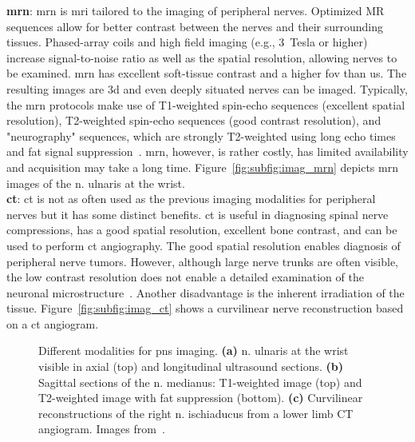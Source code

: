 \textbf{\gls{mrn}}: \gls{mrn} is \gls{mri} tailored to the imaging of peripheral nerves. Optimized MR sequences allow for better contrast between the nerves and their surrounding tissues. Phased-array coils and high field imaging (e.g., 3~Tesla or higher) increase signal-to-noise ratio as well as the spatial resolution, allowing nerves to be examined. \gls{mrn} has excellent soft-tissue contrast and a higher \gls{fov} than \gls{us}. The resulting images are \gls{3d} and even deeply situated nerves can be imaged. Typically, the \gls{mrn} protocols make use of T1-weighted spin-echo sequences (excellent spatial resolution), T2-weighted spin-echo sequences (good contrast resolution), and "neurography" sequences, which are strongly T2-weighted using long echo times and fat signal suppression~\cite{Ohana2014CurrentSystem}. \gls{mrn}, however, is rather costly, has limited availability and acquisition may take a long time. Figure~\ref{fig:subfig:imag_mrn} depicts \gls{mrn} images of the \gls{n.} ulnaris at the wrist.\\

\textbf{\gls{ct}}: \gls{ct} is not as often used as the previous imaging modalities for peripheral nerves but it has some distinct benefits. \gls{ct} is useful in diagnosing spinal nerve compressions, has a good spatial resolution, excellent bone contrast, and can be used to perform \gls{ct} angiography. The good spatial resolution enables diagnosis of peripheral nerve tumors. However, although large nerve trunks are often visible, the low contrast resolution does not enable a detailed examination of the neuronal microstructure~\cite{Ohana2014CurrentSystem}. Another disadvantage is the inherent irradiation of the tissue. Figure~\ref{fig:subfig:imag_ct} shows a curvilinear nerve reconstruction based on a \gls{ct} angiogram.\\


\begin{figure}[htbp]
	\centering
	\hfill
	\hfill
	\caption[Modalities for Imaging of the Peripheral Nervous System]{Different modalities for \acrlong{pns} imaging. \textbf{(a)} \gls{n.} ulnaris at the wrist visible in axial (top) and longitudinal ultrasound sections. \textbf{(b)} Sagittal sections of the \gls{n.} medianus: T1-weighted image (top) and T2-weighted image with fat suppression (bottom). \textbf{(c)} Curvilinear reconstructions of the right \gls{n.} ischiaducus from a lower limb CT angiogram. Images from~\cite{Mohassel2015}.}
	\label{fig:imag_modalities}  
\end{figure}

